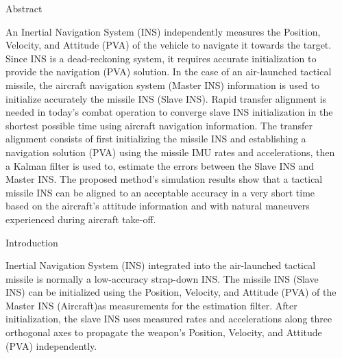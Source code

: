 \documentclass[final]{beamer}
\newlength{\sepwidth}
\newlength{\colwidth}
\newcommand{\separatorcolumn}{\begin{column}{\sepwidth}\end{column}}
\begin{document}
\begin{frame}[t]
\begin{columns}[t]
\separatorcolumn

\begin{column}{\colwidth}

  \begin{block}{Abstract}
  
 An Inertial Navigation System (INS) independently measures the Position, Velocity, and Attitude (PVA) of the vehicle to navigate it towards the target. Since INS is a dead-reckoning system, it requires accurate initialization to provide the navigation (PVA) solution. In the case of an air-launched tactical missile, the aircraft navigation system (Master  INS) information is used to initialize accurately the missile  INS  (Slave  INS). Rapid transfer alignment is needed in today’s combat operation to converge slave INS initialization in the shortest possible time using aircraft navigation information. The transfer alignment consists of first initializing the missile INS and establishing a navigation solution (PVA) using the missile IMU rates and accelerations, then a Kalman filter is used to, estimate the errors between the  Slave  INS  and  Master  INS.  The proposed method’s simulation results show that a  tactical missile INS can be aligned to an acceptable accuracy in a very short time based on the aircraft’s attitude information and with natural maneuvers experienced during aircraft take-off.
 \end{block}

  \begin{block}{Introduction}

Inertial Navigation System (INS) integrated into the air-launched  tactical  missile  is  normally  a  low-accuracy  strap-down  INS.  The  missile  INS  (Slave  INS)  can  be initialized \cite{reddy2013advanced} using the Position, Velocity, and Attitude (PVA) of the Master INS (Aircraft)as measurements for the estimation filter. After initialization, the slave INS uses measured rates and accelerations along three orthogonal axes to propagate the weapon’s Position, Velocity, and Attitude (PVA) independently.



\end{block}
\end{column}
\end{columns}
\end{frame}
\end{document}
